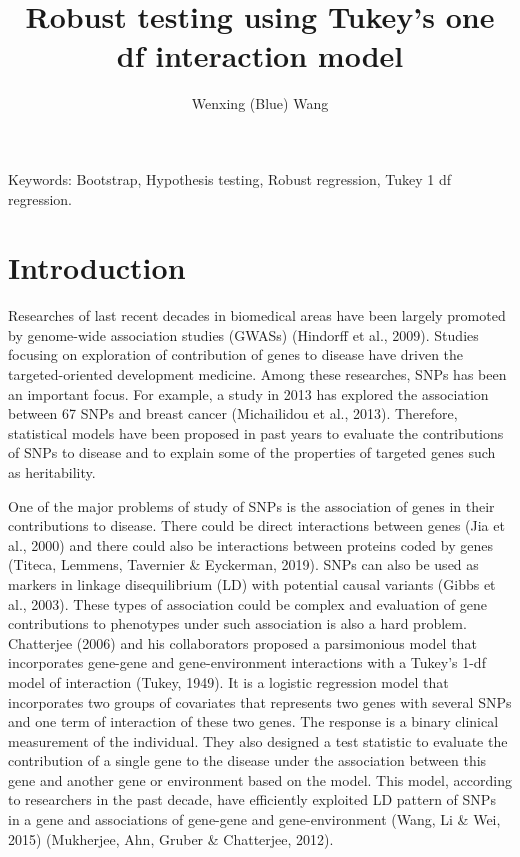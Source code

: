 \documentclass[12pt]{article}
\title{Robust testing using Tukey's one df interaction model}
\author{Wenxing (Blue) Wang }
\begin{document}
\maketitle

\noindent Keywords: Bootstrap, Hypothesis testing, Robust regression, Tukey 1 df regression.

\section{Introduction}

Researches of last recent decades in biomedical areas have been largely promoted by genome-wide association studies (GWASs) (Hindorff et al., 2009). Studies focusing on exploration of contribution of genes to disease have driven the targeted-oriented development medicine. Among these researches, SNPs has been an important focus. For example, a study in 2013 has explored the association between 67 SNPs and breast cancer (Michailidou et al., 2013). Therefore, statistical models have been proposed in past years to evaluate the contributions of SNPs to disease and to explain some of the properties of targeted genes such as heritability.

One of the major problems of study of SNPs is the association of genes in their contributions to disease. There could be direct interactions between genes (Jia et al., 2000) and there could also be interactions between proteins coded by genes (Titeca, Lemmens, Tavernier \& Eyckerman, 2019). SNPs can also be used as markers in linkage disequilibrium (LD) with potential causal variants (Gibbs et al., 2003). These types of association could be complex and evaluation of gene contributions to phenotypes under such association is also a hard problem. Chatterjee (2006) and his collaborators proposed a parsimonious model that incorporates gene-gene and gene-environment interactions with a Tukey’s 1-df model of interaction (Tukey, 1949). It is a logistic regression model that incorporates two groups of covariates that represents two genes with several SNPs and one term of interaction of these two genes. The response is a binary clinical measurement of the individual. They also designed a test statistic to evaluate the contribution of a single gene to the disease under the association between this gene and another gene or environment based on the model. This model, according to researchers in the past decade, have efficiently exploited LD pattern of SNPs in a gene and associations of gene-gene and gene-environment (Wang, Li \& Wei, 2015) (Mukherjee, Ahn, Gruber \& Chatterjee, 2012).
\end{document}
